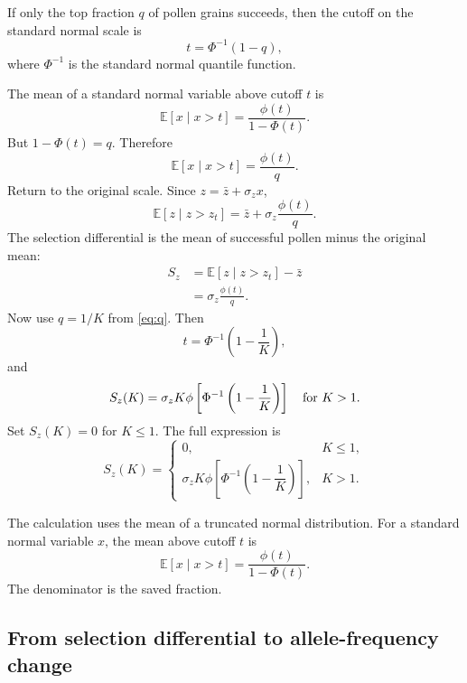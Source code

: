 \documentclass[12pt]{article}
\newcommand{\E}{\mathbb{E}}
\begin{document}
If only the top fraction $q$ of pollen grains succeeds, then the cutoff on the standard normal scale is
\begin{equation}
t=\Phi^{-1}(1-q),
\end{equation}
where $\Phi^{-1}$ is the standard normal quantile function.

The mean of a standard normal variable above cutoff $t$ is
\begin{equation}
\E[x\mid x>t]=\frac{\phi(t)}{1-\Phi(t)}.
\end{equation}
But $1-\Phi(t)=q$. Therefore
\begin{equation}
\E[x\mid x>t]=\frac{\phi(t)}{q}.
\end{equation}
Return to the original scale. Since $z=\bar{z}+\sigma_z x$,
\begin{equation}
\E[z\mid z>z_t]=\bar{z}+\sigma_z\frac{\phi(t)}{q}.
\end{equation}
The selection differential is the mean of successful pollen minus the original mean:
\begin{align}
S_z
&=\E[z\mid z>z_t]-\bar{z} \\
&=\sigma_z\frac{\phi(t)}{q}.
\end{align}
Now use $q=1/K$ from \eqref{eq:q}. Then
\begin{equation}
t=\Phi^{-1}\left(1-\frac{1}{K}\right),
\end{equation}
and
\begin{equation}
S_z(K)=\sigma_z K\phi\left[\Phi^{-1}\left(1-\frac{1}{K}\right)\right]
\quad \hbox{for } K>1.
\end{equation}
Set $S_z(K)=0$ for $K\leq 1$. The full expression is
\begin{equation}
S_z(K)=
\begin{cases}
0, & K\leq 1,\\[6pt]
\sigma_z K\phi\left[\Phi^{-1}\left(1-\dfrac{1}{K}\right)\right], & K>1.
\end{cases}
\label{eq:Sz}
\end{equation}

\begin{rulebox}
The calculation uses the mean of a truncated normal distribution. For a standard normal variable $x$, the mean above cutoff $t$ is
\[
\E[x\mid x>t]=\frac{\phi(t)}{1-\Phi(t)}.
\]
The denominator is the saved fraction.
\end{rulebox}

\subsection{From selection differential to allele-frequency change}
\end{document}
